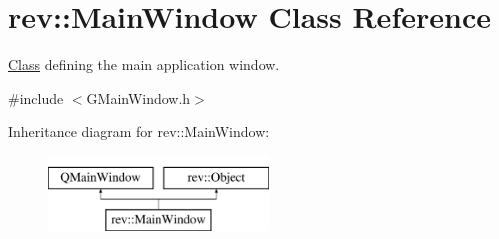 \hypertarget{classrev_1_1_main_window}{}\section{rev\+::Main\+Window Class Reference}
\label{classrev_1_1_main_window}


\mbox{\hyperlink{struct_class}{Class}} defining the main application window.  




{\ttfamily \#include $<$G\+Main\+Window.\+h$>$}

Inheritance diagram for rev\+::Main\+Window\+:\begin{figure}[H]
\begin{center}
\leavevmode
\includegraphics[height=2.000000cm]{classrev_1_1_main_window}
\end{center}
\end{figure}
